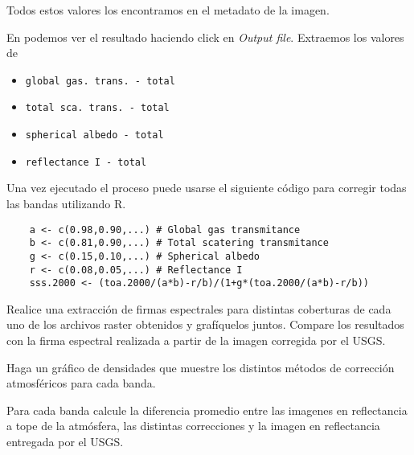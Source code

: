 Todos estos valores los encontramos en el metadato de la imagen.

En  podemos ver el resultado haciendo click en \emph{Output
file}. Extraemos los valores de
 \begin{itemize}
     \item \texttt{global gas. trans. - total}
     \item \texttt{total sca. trans. - total}
     \item \texttt{spherical albedo - total}
     \item \texttt{reflectance I - total}
 \end{itemize}

Una vez ejecutado el proceso puede usarse el siguiente c\'odigo para corregir
todas las bandas utilizando R.

\begin{lstlisting}
    a <- c(0.98,0.90,...) # Global gas transmitance
    b <- c(0.81,0.90,...) # Total scatering transmitance
    g <- c(0.15,0.10,...) # Spherical albedo
    r <- c(0.08,0.05,...) # Reflectance I
    sss.2000 <- (toa.2000/(a*b)-r/b)/(1+g*(toa.2000/(a*b)-r/b))
\end{lstlisting}


\begin{act}
    Realice una extracci\'on de firmas espectrales para distintas coberturas de
    cada uno de los archivos raster obtenidos y graf\'iquelos juntos.
    Compare los resultados con la firma espectral realizada a partir de la imagen corregida
    por el USGS.
\end{act}

\begin{act}
    Haga un gr\'afico de densidades que muestre los distintos m\'etodos de
    correcci\'on atmosf\'ericos para cada banda.
\end{act}

\begin{act}
    Para cada banda calcule la diferencia promedio entre las imagenes en
    reflectancia a tope de la atm\'osfera, las distintas correcciones
    y la imagen en reflectancia entregada por el USGS.
\end{act}
